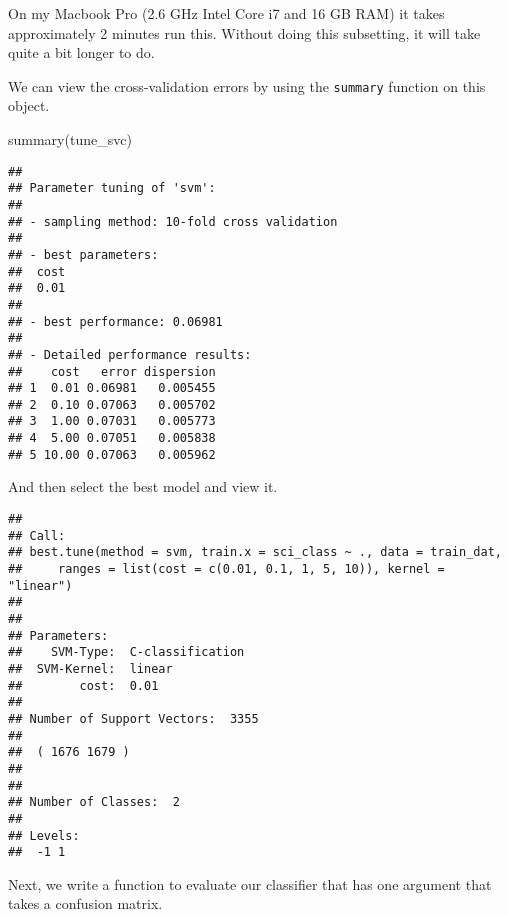 \documentclass[
]{book}
\newenvironment{Shaded}{\begin{snugshade}}{\end{snugshade}}
\newcommand{\FunctionTok}[1]{\textcolor[rgb]{0.00,0.00,0.00}{#1}}
\newcommand{\NormalTok}[1]{#1}
\newcommand{\OtherTok}[1]{\textcolor[rgb]{0.56,0.35,0.01}{#1}}
\newcommand{\SpecialCharTok}[1]{\textcolor[rgb]{0.00,0.00,0.00}{#1}}
\begin{document}
On my Macbook Pro (2.6 GHz Intel Core i7 and 16 GB RAM) it takes approximately 2 minutes run this. Without doing this subsetting, it will take quite a bit longer to do.

We can view the cross-validation errors by using the \texttt{summary} function on this object.

\begin{Shaded}
\begin{Highlighting}[]
\FunctionTok{summary}\NormalTok{(tune\_svc)}
\end{Highlighting}
\end{Shaded}

\begin{verbatim}
## 
## Parameter tuning of 'svm':
## 
## - sampling method: 10-fold cross validation 
## 
## - best parameters:
##  cost
##  0.01
## 
## - best performance: 0.06981 
## 
## - Detailed performance results:
##    cost   error dispersion
## 1  0.01 0.06981   0.005455
## 2  0.10 0.07063   0.005702
## 3  1.00 0.07031   0.005773
## 4  5.00 0.07051   0.005838
## 5 10.00 0.07063   0.005962
\end{verbatim}

And then select the best model and view it.

\begin{Shaded}
\end{Shaded}

\begin{verbatim}
## 
## Call:
## best.tune(method = svm, train.x = sci_class ~ ., data = train_dat, 
##     ranges = list(cost = c(0.01, 0.1, 1, 5, 10)), kernel = "linear")
## 
## 
## Parameters:
##    SVM-Type:  C-classification 
##  SVM-Kernel:  linear 
##        cost:  0.01 
## 
## Number of Support Vectors:  3355
## 
##  ( 1676 1679 )
## 
## 
## Number of Classes:  2 
## 
## Levels: 
##  -1 1
\end{verbatim}

Next, we write a function to evaluate our classifier that has one argument that takes a confusion matrix.
\end{document}
